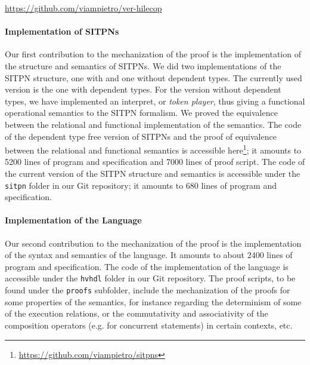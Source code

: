 \documentclass[pdflatex,sn-mathphys]{sn-jnl}%
\theoremstyle{thmstyleone}%
\theoremstyle{thmstyletwo}%
\theoremstyle{thmstylethree}%
\begin{document}
\begin{center}
  \url{https://github.com/viampietro/ver-hilecop}
\end{center}

\paragraph{Implementation of SITPNs}

% 
%

Our first contribution to the mechanization of the proof is the
implementation of the structure and semantics of SITPNs.  We did two
implementations of the SITPN structure, one with and one without
dependent types. The currently used version is the one with dependent
types.  For the version without dependent types, we have implemented
an interpret, or \textit{token player}, thus giving a functional
operational semantics to the SITPN formalism. We proved the
equivalence between the relational and functional implementation of
the semantics. The code of the dependent type free version of SITPNs
and the proof of equivalence between the relational and functional
semantics is accessible
here\footnote{\url{https://github.com/viampietro/sitpns}}; it amounts
to 5200 lines of program and specification and 7000 lines of proof
script. The code of the current version of the SITPN structure and
semantics is accessible under the \texttt{sitpn} folder in our
\textsf{Git} repository; it amounts to 680 lines of program and
specification.

\paragraph{Implementation of the \hvhdl{} Language}

% 
%

Our second contribution to the mechanization of the proof is the
implementation of the syntax and semantics of the \hvhdl{} language.
It amounts to about 2400 lines of program and specification. The code
of the implementation of the \hvhdl{} language is accessible under the
\texttt{hvhdl} folder in our \textsf{Git} repository. The proof
scripts, to be found under the \texttt{proofs} subfolder, include the
mechanization of the proofs for some properties of the \hvhdl{}
semantics, for instance regarding the determinism of some of the
execution relations, or the commutativity and associativity of the
composition operators (e.g. for concurrent statements) in certain
contexts, etc.
\end{document}
